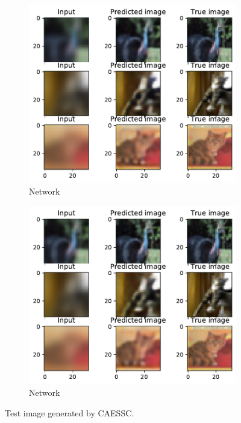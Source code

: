 \begin{figure}[H]
    \centering
    \begin{subfigure}{\textwidth}
        \centering
        \includegraphics[height=0.47\textheight,keepaspectratio]{subsections/caessc/test_CAESSC_d22_f128_half.pdf}
        \caption{Network }    
    \end{subfigure}
    \begin{subfigure}{\textwidth}
        \centering
        \includegraphics[height=0.47\textheight,keepaspectratio]{subsections/caessc/test_CAESSC_d30_f64.pdf}
        \caption{Network }            
    \end{subfigure}
    \caption{Test image generated by CAESSC.}
\end{figure}

